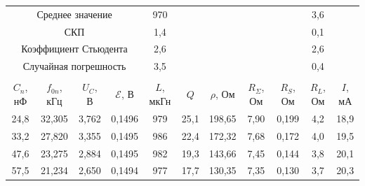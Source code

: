 \documentclass[a4paper, 12pt]{article}
\begin{document}
\begin{table}[H]
\begin{tabular}{|ccccccccccc|}
        \multicolumn{4}{|c|}{Среднее значение} & \multicolumn{1}{c|}{970} & \multicolumn{4}{c|}{\multirow{4}{*}{}} & \multicolumn{1}{c|}{3,6} & \multirow{4}{*}{} \\ \cline{1-5} \cline{10-10}
        \multicolumn{4}{|c|}{СКП} & \multicolumn{1}{c|}{1,4} & \multicolumn{4}{c|}{} & \multicolumn{1}{c|}{0,1} &  \\ \cline{1-5} \cline{10-10}
        \multicolumn{4}{|c|}{Коэффициент Стьюдента} & \multicolumn{1}{c|}{2,6} & \multicolumn{4}{c|}{} & \multicolumn{1}{c|}{2,6} &  \\ \cline{1-5} \cline{10-10}
        \multicolumn{4}{|c|}{Случайная погрешность} & \multicolumn{1}{c|}{3,5} & \multicolumn{4}{c|}{} & \multicolumn{1}{c|}{0,4} &  \\ \hline
        \multicolumn{11}{c}{} \\ \hline
        \multicolumn{1}{|c|}{$C_n$, нФ} & \multicolumn{1}{c|}{$f_{0n}$, кГц} & \multicolumn{1}{c|}{$U_C$, В} & \multicolumn{1}{c|}{$\mathcal{E}$, В} & \multicolumn{1}{c|}{$L$, мкГн} & \multicolumn{1}{c|}{$Q$} & \multicolumn{1}{c|}{$\rho$, Ом} & \multicolumn{1}{c|}{$R_\Sigma$, Ом} & \multicolumn{1}{c|}{$R_S$, Ом} & \multicolumn{1}{c|}{$R_L$, Ом} & $I$, мА \\ \hline
        \multicolumn{1}{|c|}{24,8} & \multicolumn{1}{c|}{32,305} & \multicolumn{1}{c|}{3,762} & \multicolumn{1}{c|}{0,1496} & \multicolumn{1}{c|}{979} & \multicolumn{1}{c|}{25,1} & \multicolumn{1}{c|}{198,65} & \multicolumn{1}{c|}{7,90} & \multicolumn{1}{c|}{0,199} & \multicolumn{1}{c|}{4,2} & 18,9 \\ \hline
        \multicolumn{1}{|c|}{33,2} & \multicolumn{1}{c|}{27,820} & \multicolumn{1}{c|}{3,355} & \multicolumn{1}{c|}{0,1495} & \multicolumn{1}{c|}{986} & \multicolumn{1}{c|}{22,4} & \multicolumn{1}{c|}{172,32} & \multicolumn{1}{c|}{7,68} & \multicolumn{1}{c|}{0,172} & \multicolumn{1}{c|}{4,0} & 19,5 \\ \hline
        \multicolumn{1}{|c|}{47,6} & \multicolumn{1}{c|}{23,275} & \multicolumn{1}{c|}{2,884} & \multicolumn{1}{c|}{0,1495} & \multicolumn{1}{c|}{982} & \multicolumn{1}{c|}{19,3} & \multicolumn{1}{c|}{143,66} & \multicolumn{1}{c|}{7,45} & \multicolumn{1}{c|}{0,144} & \multicolumn{1}{c|}{3,8} & 20,1 \\ \hline
        \multicolumn{1}{|c|}{57,5} & \multicolumn{1}{c|}{21,234} & \multicolumn{1}{c|}{2,650} & \multicolumn{1}{c|}{0,1494} & \multicolumn{1}{c|}{977} & \multicolumn{1}{c|}{17,7} & \multicolumn{1}{c|}{130,35} & \multicolumn{1}{c|}{7,35} & \multicolumn{1}{c|}{0,130} & \multicolumn{1}{c|}{3,7} & 20,3 \\ \hline

\end{tabular}
\end{table}
\end{document}
